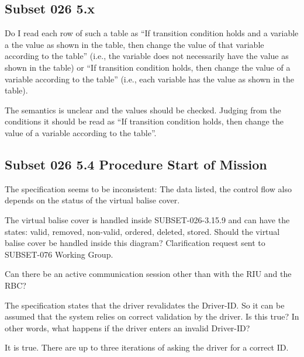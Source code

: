 \documentclass{template/openetcs_article}
\begin{document}
\subsection{Subset 026 5.x}

Do I read each row of such a table as ``If transition condition holds and a variable a the value as shown in the table, then change the value of that variable according to the table'' (i.e., the variable does not necessarily have the value as shown in the table) or ``If transition condition holds, then change the value of a variable according to the table'' (i.e., each variable has the value as shown in the table).

\resolution The semantics is unclear and the values should be checked. Judging from the conditions it should be read as ``If transition condition holds, then change the value of a variable according to the table''. 


\subsection{Subset 026 5.4 Procedure Start of Mission}

The specification seems to be inconsistent:
The data listed, the control flow also depends on the status of the virtual balise cover.

\resolution The virtual balise cover is handled inside SUBSET-026-3.15.9 and can have the states: valid, removed, non-valid, ordered, deleted, stored. Should the virtual balise cover be handled inside this diagram? Clarification request sent to SUBSET-076 Working Group.




Can there be an active communication session other than with the RIU and the RBC?

The specification states that the driver revalidates the Driver-ID. So it can be assumed that the system relies on correct validation by the driver. Is this true? 
In other words, what happens if the driver enters an invalid Driver-ID?

\resolution It is true. There are up to three iterations of asking the driver for a correct ID.
\end{document}
